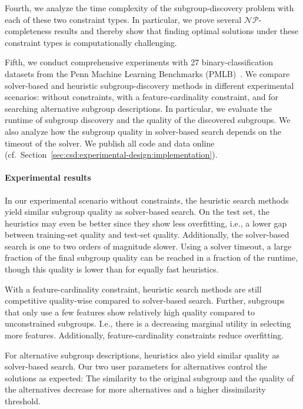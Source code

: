 \documentclass{article}
\theoremstyle{definition}
\begin{document}
Fourth, we analyze the time complexity of the subgroup-discovery problem with each of these two constraint types.
In particular, we prove several $\mathcal{NP}$-completeness results and thereby show that finding optimal solutions under these constraint types is computationally challenging.

Fifth, we conduct comprehensive experiments with 27 binary-classification datasets from the Penn Machine Learning Benchmarks (PMLB)~\cite{olson2017pmlb, romano2021pmlb}.
We compare solver-based and heuristic subgroup-discovery methods in different experimental scenarios:
without constraints, with a feature-cardinality constraint, and for searching alternative subgroup descriptions.
In particular, we evaluate the runtime of subgroup discovery and the quality of the discovered subgroups.
We also analyze how the subgroup quality in solver-based search depends on the timeout of the solver.
We publish all code and data online (cf.~Section~\ref{sec:csd:experimental-design:implementation}).

\paragraph{Experimental results}

In our experimental scenario without constraints, the heuristic search methods yield similar subgroup quality as solver-based search.
On the test set, the heuristics may even be better since they show less overfitting, i.e., a lower gap between training-set quality and test-set quality.
Additionally, the solver-based search is one to two orders of magnitude slower.
Using a solver timeout, a large fraction of the final subgroup quality can be reached in a fraction of the runtime, though this quality is lower than for equally fast heuristics.

With a feature-cardinality constraint, heuristic search methods are still competitive quality-wise compared to solver-based search.
Further, subgroups that only use a few features show relatively high quality compared to unconstrained subgroups.
I.e., there is a decreasing marginal utility in selecting more features.
Additionally, feature-cardinality constraints reduce overfitting.

For alternative subgroup descriptions, heuristics also yield similar quality as solver-based search.
Our two user parameters for alternatives control the solutions as expected:
The similarity to the original subgroup and the quality of the alternatives decrease for more alternatives and a higher dissimilarity threshold.
\end{document}
